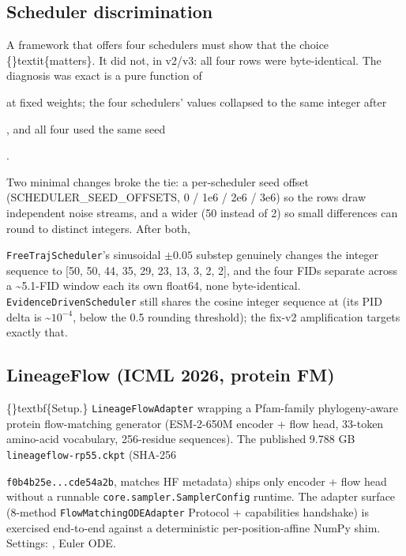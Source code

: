 \documentclass{article}
\begin{document}
\subsection{Scheduler discrimination}
A framework that offers four schedulers must show that the choice \{\}textit\{matters\}. It did not, in v2/v3: all four rows were byte-identical. The diagnosis was exact   is a pure function of

 at fixed weights; the four schedulers'  values collapsed to the same integer  after

, and all four used the same seed

.

Two minimal changes broke the tie: a per-scheduler seed offset (SCHEDULER\_SEED\_OFFSETS, 0 / 1e6 / 2e6 / 3e6) so the rows draw independent noise streams, and a wider  (50 instead of 2) so small  differences can round to distinct integers. After both,

\texttt{FreeTrajScheduler}'s sinusoidal $\pm 0.05$ substep genuinely changes the integer sequence to [50, 50, 44, 35, 29, 23, 13, 3, 2, 2], and the four FIDs separate across a \textasciitilde{}5.1-FID window  each its own float64, none byte-identical. \texttt{EvidenceDrivenScheduler} still shares the cosine integer sequence at  (its PID delta is \textasciitilde{}$10^{-4}$, below the 0.5 rounding threshold); the fix-v2  amplification targets exactly that.

\subsection{LineageFlow (ICML 2026, protein FM)}
\{\}textbf\{Setup.\} \texttt{LineageFlowAdapter} wrapping a Pfam-family phylogeny-aware protein flow-matching generator (ESM-2-650M encoder + flow head, 33-token amino-acid vocabulary, 256-residue sequences). The published 9.788 GB \texttt{lineageflow-rp55.ckpt} (SHA-256

\texttt{f0b4b25e...cde54a2b}, matches HF metadata) ships only encoder + flow head without a runnable \texttt{core.sampler.SamplerConfig} runtime. The adapter surface (8-method \texttt{FlowMatchingODEAdapter} Protocol + capabilities handshake) is exercised end-to-end against a deterministic per-position-affine NumPy shim. Settings: , Euler ODE.
\end{document}
